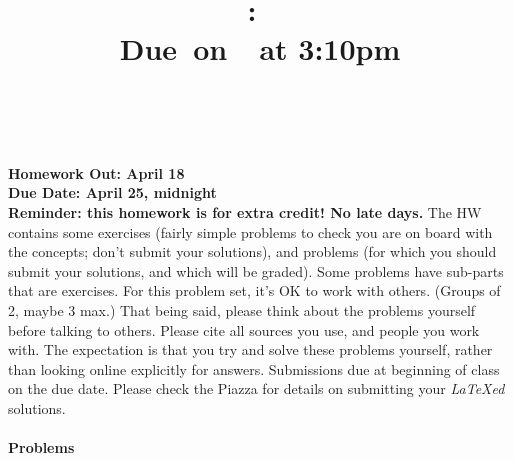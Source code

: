 \documentclass{article}
\title{    \vspace{2in}
    \textmd{\textbf{\hmwkClass:\ \hmwkTitle}}\\
    \normalsize\vspace{0.1in}\small{Due\ on\ \hmwkDueDate\ at 3:10pm}\\
    \vspace{0.1in}\large{\textit{\hmwkClassInstructor\ \hmwkClassTime}}
    \vspace{3in}
}
\author{\hmwkAuthorName}
\date{}
\theoremstyle{plain}
\newcommand{\hmwkAssignedDate}{April 18}
\newcommand{\hmwkDueDate}{April 25, midnight}
\begin{document}

\pagebreak

{\bf Homework Out: \hmwkAssignedDate}\\
{\bf Due Date:  \hmwkDueDate}\\
{\bf Reminder: this homework is for extra credit! No late days.}
The HW contains some exercises (fairly simple problems to check you
are on board with the concepts; don’t submit your solutions), and
problems (for which you should submit your solutions, and which will
be graded). Some problems have sub-parts that are exercises.  For this
problem set, it’s OK to work with others. (Groups of 2, maybe 3 max.)
That being said, please think about the problems yourself before
talking to others. Please cite all sources you use, and people you
work with. The expectation is that you try and solve these problems
yourself, rather than looking online explicitly for
answers. Submissions due at beginning of class on the due date.
Please check the Piazza for details on submitting your \emph{LaTeXed}
solutions.

\newcommand{\poly}{\textrm{poly}}
\paragraph{Problems}
\end{document}
